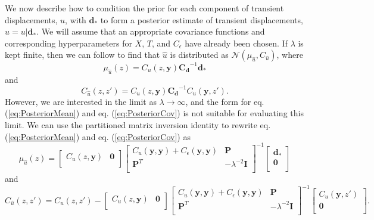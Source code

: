 \documentclass[10pt,a4paper]{article}
\begin{document}
We now describe how to condition the prior for each component of transient displacements, $u$, with $\bm{d}_*$ to form a posterior estimate of transient displacements, $\hat{u} = u | \bm{d}_*$. We will assume that an appropriate covariance functions and corresponding hyperparameters for $X$, $T$, and $C_\epsilon$ have already been chosen. If $\lambda$ is kept finite, then we can follow \citet{Rasmussen2006} to find that $\hat{u}$ is distributed as $\mathcal{N}(\mu_{\hat{u}},C_{\hat{u}})$, where
\begin{equation}\label{eq:PosteriorMean}
\mu_{\hat{u}}(z) = C_u(z,\bm{y})\bm{C_d}^{-1}\bm{d}_*
\end{equation}    
and
\begin{equation}\label{eq:PosteriorCov}
C_{\hat{u}}(z,z') = C_u(z,\bm{y})\bm{C_d}^{-1}C_u(\bm{y},z').
\end{equation}
However, we are interested in the limit as $\lambda \to \infty$, and the form for eq. (\ref{eq:PosteriorMean}) and eq. (\ref{eq:PosteriorCov}) is not suitable for evaluating this limit. We can use the partitioned matrix inversion identity \citep[e.g.,][]{Press2007} to rewrite eq. (\ref{eq:PosteriorMean}) and eq. (\ref{eq:PosteriorCov}) as
 \begin{equation}\label{eq:PosteriorMean2}
\mu_{\hat{u}}(z) =
\left[ 
\begin{array}{cc}
C_u(z,\bm{y}) & \bm{0} \\
\end{array}
\right]
\left[
\begin{array}{cc}
C_u(\bm{y},\bm{y}) + C_\epsilon(\bm{y},\bm{y}) & \bm{P} \\
\bm{P}^T  & -\lambda^{-2} \bm{I} \\
\end{array}
\right]^{-1}
\left[
\begin{array}{c}
\bm{d}_* \\
\bm{0} \\
\end{array}
\right]
\end{equation}    
and
\begin{equation}\label{eq:PosteriorCov2}
C_{\hat{u}}(z,z') = 
C_u(z,z') - 
\left[ 
\begin{array}{cc}
C_u(z,\bm{y}) & \bm{0} \\
\end{array}
\right]
\left[
\begin{array}{cc}
C_u(\bm{y},\bm{y}) + C_\epsilon(\bm{y},\bm{y}) & \bm{P} \\
\bm{P}^T  & -\lambda^{-2} \bm{I} \\
\end{array}
\right]^{-1}
\left[
\begin{array}{c}
C_u(\bm{y},z') \\
\bm{0} \\
\end{array}
\right].
\end{equation}
\end{document}
